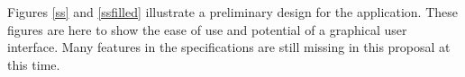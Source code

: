 \documentclass{article}
\begin{document}
Figures \ref{ss} and \ref{ssfilled} illustrate a preliminary design for the
application.  These figures are here to show the ease of use and potential of a
graphical user interface.  Many features in the specifications are still
missing in this proposal at this time.

\end{document}

